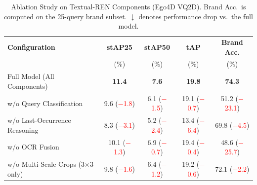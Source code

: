 \begin{table}[t]
\centering
\caption{Ablation Study on Textual-REN Components (Ego4D VQ2D).
  Brand Acc.\ is computed on the 25-query brand subset.
  $\downarrow$ denotes performance drop vs.\ the full model.}
\label{tab:ablation}
\begin{tabular}{lcccc}
\toprule
\textbf{Configuration} & \textbf{stAP25} & \textbf{stAP50} & \textbf{tAP} & \textbf{Brand Acc.} \\
                       & (\%)            & (\%)            & (\%)         & (\%) \\
\midrule
Full Model (All Components)              & \textbf{11.4} & \textbf{7.6} & \textbf{19.8} & \textbf{74.3} \\
\midrule
w/o Query Classification                 & 9.6 (\textcolor{red}{$-$1.8})  & 6.1 (\textcolor{red}{$-$1.5})  & 19.1 (\textcolor{red}{$-$0.7})  & 51.2 (\textcolor{red}{$-$23.1}) \\
w/o Last-Occurrence Reasoning            & 8.3 (\textcolor{red}{$-$3.1})  & 5.2 (\textcolor{red}{$-$2.4})  & 13.4 (\textcolor{red}{$-$6.4})  & 69.8 (\textcolor{red}{$-$4.5})  \\
w/o OCR Fusion                           & 10.1 (\textcolor{red}{$-$1.3}) & 6.9 (\textcolor{red}{$-$0.7})  & 19.4 (\textcolor{red}{$-$0.4})  & 48.6 (\textcolor{red}{$-$25.7}) \\
w/o Multi-Scale Crops (3$\times$3 only) & 9.8 (\textcolor{red}{$-$1.6})  & 6.4 (\textcolor{red}{$-$1.2})  & 19.2 (\textcolor{red}{$-$0.6})  & 72.1 (\textcolor{red}{$-$2.2})  \\
\bottomrule
\end{tabular}
\end{table}


